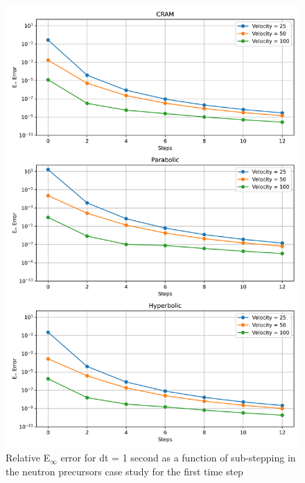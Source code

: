 \begin{figure}[p]
    \centering
    \includegraphics[width=5in]{images/chapter-5/caseStudies/neutronPrecursors/dt1/neutronPrecursorsEinfErrorerrorWithSteps.png}
    \caption{Relative E$_{\infty}$ error for dt = 1 second as a function of sub-stepping in the neutron precursors case study for the first time step}
    \label{fig:neutron_precursors_Einf_dt1_with_substeps}
\end{figure}

\clearpage

